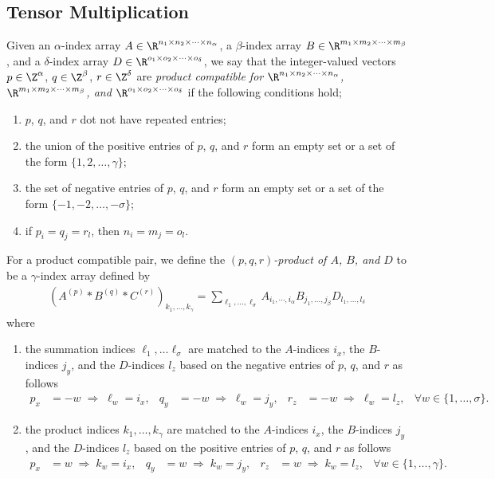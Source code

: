 \documentclass[11pt]{article}
\theoremstyle{remark}
\begin{document}
\subsection{Tensor Multiplication}

Given an $\alpha$-index array $A\in\R^{n_1\times n_2\times\cdots\times n_\alpha}$, a $\beta$-index array
$B\in\R^{m_1\times m_2\times\cdots\times m_\beta}$, and a $\delta$-index array $D\in\R^{o_1\times o_2\times\cdots\times o_\delta}$, we
say that the integer-valued vectors $p\in\Z^\alpha$, $q\in\Z^\beta$, $r\in\Z^\delta$ are
\emph{product compatible for $\R^{n_1\times n_2\times\cdots\times n_\alpha}$, $\R^{m_1\times m_2\times\cdots\times m_\beta}$,
  and $\R^{o_1\times o_2\times\cdots\times o_\delta}$} if the following conditions hold;
\begin{enumerate}
\item $p$, $q$, and $r$ dot not have repeated entries;
\item the union of the positive entries of $p$, $q$, and $r$ form an
  empty set or a set of the form $\{1,2,\dots,\gamma\}$;
\item the set of negative entries of $p$, $q$, and $r$ form an empty
  set or a set of the form $\{-1,-2,\dots,-\sigma\}$;
\item if $p_i=q_j=r_l$, then $n_i=m_j=o_l$.
\end{enumerate}
For a product compatible pair, we define the \emph{$(p,q,r)$-product of
  $A$, $B$, and $D$} to be a $\gamma$-index array defined by
\begin{align}\label{eq:tprod}
  (A^{(p)} * B^{(q)} * C^{(r)})_{k_1,\dots,k_\gamma}=\sum_{\ell_1,\dots,\ell_\sigma}
  A_{i_1,\cdots,i_\alpha} B_{j_1,\dots,j_\beta} D_{l_1,\dots,l_\delta}
\end{align}
where
\begin{enumerate}
\item the summation indices $\ell_1,\dots\ell_\sigma$ are matched to the
  $A$-indices $i_x$, the $B$-indices $j_y$, and the $D$-indices $l_z$
  based on the negative entries of $p$, $q$, and $r$ as follows
  \begin{align*}
    p_x&=-w\;\Rightarrow\; \ell_w=i_x, &
    q_y&=-w\;\Rightarrow\; \ell_w=j_y, &
    r_z&=-w\;\Rightarrow\; \ell_w=l_z, &
    \forall w\in\{1,\dots,\sigma\}.
  \end{align*}
\item the product indices $k_1,\dots,k_\gamma$ are matched to the
  $A$-indices $i_x$, the $B$-indices $j_y$ , and the $D$-indices $l_z$
  based on the positive entries of $p$, $q$, and $r$ as follows
  \begin{align*}
    p_x&=w\;\Rightarrow\; k_w=i_x, &
    q_y&=w\;\Rightarrow\; k_w=j_y, &
    r_z&=w\;\Rightarrow\; k_w=l_z, &
    \forall w\in\{1,\dots,\gamma\}.
  \end{align*}
\end{enumerate}
\end{document}
